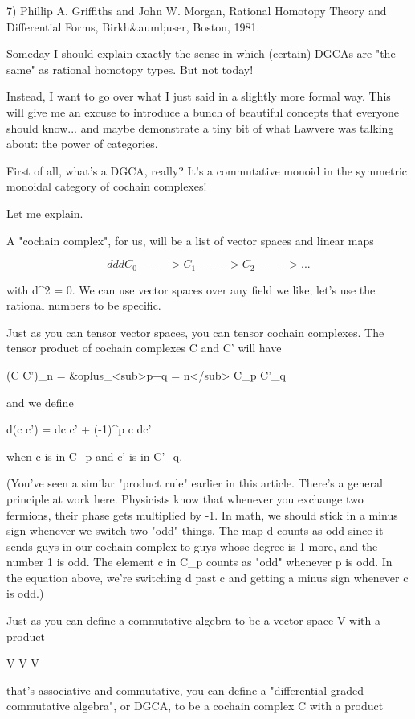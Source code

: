 7) Phillip A. Griffiths and John W. Morgan, Rational Homotopy 
Theory and Differential Forms, Birkh&auml;user, Boston, 1981.

Someday I should explain exactly the sense in which (certain) DGCAs
are "the same" as rational homotopy types.  But not today!

Instead, I want to go over what I just said in a slightly more formal
way.  This will give me an excuse to introduce a bunch of beautiful
concepts that everyone should know... and maybe demonstrate a tiny bit
of what Lawvere was talking about: the power of categories.

First of all, what's a DGCA, really?  It's a commutative monoid in the
symmetric monoidal category of cochain complexes!

Let me explain.

A "cochain complex", for us, will be a list of vector spaces and
linear maps


$$

    d       d      d
C_{0} ---> C_{1} ---> C_{2} ---> ...
$$
    
with d^{2} = 0.  We can use vector spaces over any field we
like; let's use the rational numbers to be specific.

Just as you can tensor vector spaces, you can tensor cochain complexes.
The tensor product of cochain complexes C and C' will have

(C \otimes  C')_{n} = &oplus_{<sub>p+q = n}</sub> 
C_{p} \otimes  C'_{q}

and we define

d(c \otimes  c') = dc \otimes  c' + (-1)^{p} c \otimes  dc' 

when c is in C_{p} and c' is in C'_{q}.  

(You've seen a similar "product rule" earlier in this
article.  There's a general principle at work here.  Physicists know
that whenever you exchange two fermions, their phase gets multiplied
by -1.  In math, we should stick in a minus sign whenever we switch
two "odd" things.  The map d counts as odd since it sends
guys in our cochain complex to guys whose degree is 1 more, and the
number 1 is odd.  The element c in C_{p} counts as
"odd" whenever p is odd.  In the equation above, we're
switching d past c and getting a minus sign whenever c is odd.)

Just as you can define a commutative algebra to be a vector space
V with a product

V \otimes  V \to  V

that's associative and commutative, you can define a "differential
graded commutative algebra", or DGCA, to be a cochain complex C with a
product


